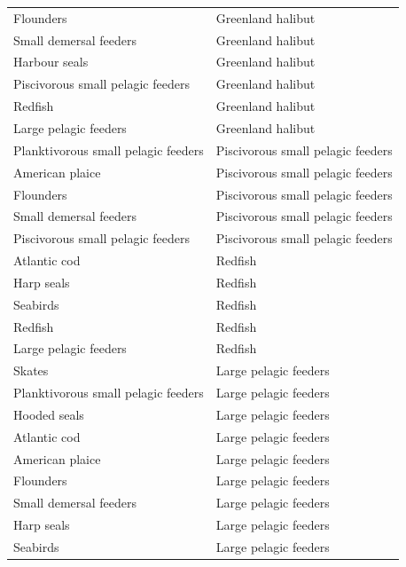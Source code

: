 \begin{singlespace}
\begin{longtable}{ p{} p{} }
    Flounders                           & Greenland halibut \\
    Small demersal feeders              & Greenland halibut \\
    Harbour seals                       & Greenland halibut \\
    Piscivorous small pelagic feeders   & Greenland halibut \\
    Redfish                             & Greenland halibut \\
    Large pelagic feeders               & Greenland halibut \\
    Planktivorous small pelagic feeders & Piscivorous small pelagic feeders \\
    American plaice                     & Piscivorous small pelagic feeders \\
    Flounders                           & Piscivorous small pelagic feeders \\
    Small demersal feeders              & Piscivorous small pelagic feeders \\
    Piscivorous small pelagic feeders   & Piscivorous small pelagic feeders \\
    Atlantic cod                        & Redfish   \\
    Harp seals                          & Redfish   \\
    Seabirds                            & Redfish   \\
    Redfish                             & Redfish   \\
    Large pelagic feeders               & Redfish   \\
    Skates                              & Large pelagic feeders \\
    Planktivorous small pelagic feeders & Large pelagic feeders \\
    Hooded seals                        & Large pelagic feeders \\
    Atlantic cod                        & Large pelagic feeders \\
    American plaice                     & Large pelagic feeders \\
    Flounders                           & Large pelagic feeders \\
    Small demersal feeders              & Large pelagic feeders \\
    Harp seals                          & Large pelagic feeders \\
    Seabirds                            & Large pelagic feeders \\

\end{longtable}
\end{singlespace}
